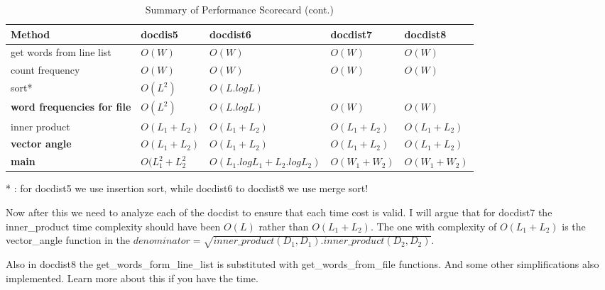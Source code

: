 \documentclass{article}
\begin{document}
    \begin{table}[h]
        \centering
        \captionsetup{labelformat=empty}
        \caption{Summary of Performance Scorecard (cont.)}
        \begin{tabular}{|p{3cm}|l|l|l|l|} 
        \hline
        Method                             & docdis5           & docdist6                         & docdist7       & docdist8        \\ 
        \hline
        get words from line list           & $O(W)$            & $O(W)$                           & $O(W)$         &  \textbf{$O(W)$ }         \\ 
        \hline
        count frequency                    & $O(W)$            & $O(W)$                           & $O(W)$         & $O(W)$          \\ 
        \hline
        sort*      & $O(L^2)$          & \textbf{$O(L.log L)$}            &                &                 \\ 
        \hline
        \textbf{word frequencies for file} & $O(L^2)$          & $O(L. log L)$                    & $O(W)$         & $O(W)$          \\ 
        \hline
        inner product                      & $O(L_1 + L_2)$    & $O(L_1 + L_2)$                   &  \textbf{$O(L_1 + L_2)$} &  \textbf{$O(L_1 + L_2)$}  \\ 
        \hline
        \textbf{vector angle}              & $O(L_1 + L_2)$    & $O(L_1 + L_2)$                   & $O(L_1 + L_2)$ & $O(L_1 + L_2)$  \\ 
        \hline
        \textbf{main}                      & $O(L_1^2 + L_2^2$ & $O(L_1. log L_1 + L_2. log L_2)$ & $O(W_1 + W_2)$ & $O(W_1 + W_2)$  \\
        \hline
        \end{tabular}
    \end{table}
    * : for docdist5 we use insertion sort, while docdist6 to docdist8 we use merge sort!
    
    Now after this 
    we need to analyze each of the docdist to ensure that each time cost is valid.
    I will argue that for docdist7 the inner\_product time complexity should have been $O(L)$ rather than $O(L_1 + L_2)$. The one with complexity of $O(L_1 + L_2)$ is the vector\_angle function in the $denominator = \sqrt{inner\_product(D_1,D_1).inner\_product(D_2,D_2)}$.

    Also in docdist8 the get\_words\_form\_line\_list is substituted with get\_words\_from\_file functions. And some other simplifications also implemented. Learn more about this if you have the time.
\end{document}
